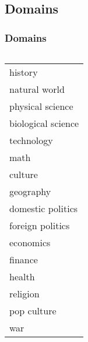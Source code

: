 \documentclass[pdf]{beamer}
\begin{document}
\subsection{Domains}
\begin{frame}
\frametitle{Domains}
  \begin{columns}
      \begin{tabular} {l}  %
        \hline   %
        history			                   \\
        natural world                  \\
        physical science               \\
        biological science             \\
        technology                     \\
        math                           \\
        culture                        \\
        geography                      \\
        domestic politics              \\
        foreign politics               \\
        economics                      \\
        finance                        \\
        health                         \\
        religion                       \\
        pop culture                    \\
        war                            \\
        \hline  %
        \end{tabular}
  \end{columns}

\end{frame}


\end{document}
